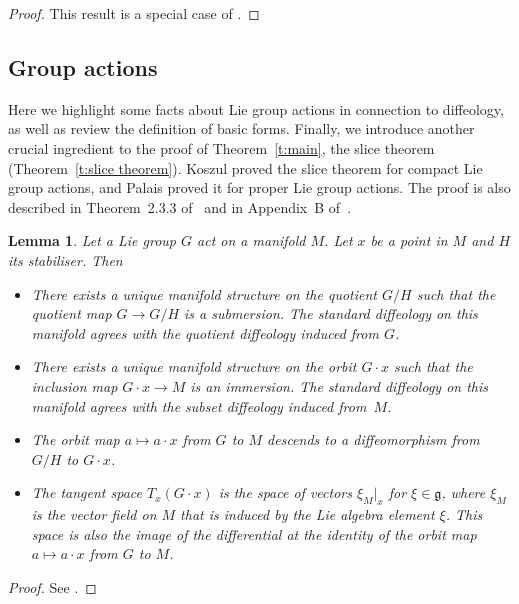 \documentclass[pdftex]{sigma}
\numberwithin{equation}{section}
\newtheorem{Lemma}[Theorem]{Lemma}
\newcommand{\g}{{\mathfrak{g}}} %
\begin{document}
\begin{proof}
This result is a special case of \cite[Section~6.38]{iglesias}.
\end{proof}

\subsection*{Group actions}

Here we highlight some facts about Lie group actions in connection to dif\/feology, as well as review the def\/inition of basic forms. Finally, we introduce another crucial ingredient to the proof of Theorem~\ref{t:main}, the slice theorem (Theorem~\ref{t:slice theorem}). Koszul \cite{koszul} proved the slice theorem for compact Lie group actions, and
Palais \cite{palais} proved it for proper Lie group actions.
The proof is also described in Theorem~2.3.3 of~\cite{DK}
and in Appendix~B of~\cite{GGK}.

\begin{Lemma} \label{facts}
Let a Lie group $G$ act on a manifold $M$.
Let $x$ be a point in $M$ and $H$ its stabiliser. Then
\begin{itemize}\itemsep=0pt
\item
There exists a unique manifold structure on the quotient $G/H$
such that the quotient map $G \to G/H$ is a submersion.
The standard diffeology on this manifold
agrees with the quotient diffeology induced from $G$.

\item
There exists a unique manifold structure on the orbit $G \cdot x$
such that the inclusion map $G \cdot x \to M$ is an immersion.
The standard diffeology on this manifold agrees with the subset diffeology
induced from~$M$.

\item
The orbit map $a \mapsto a \cdot x$ from $G$ to $M$
descends to a diffeomorphism from $G/H$ to $G \cdot x$.

\item
The tangent space $T_x(G \cdot x)$
is the space of vectors $\xi_M|_x$ for $\xi \in \g$,
where $\xi_M$ is the vector field on $M$ that is induced
by the Lie algebra element $\xi$.
This space is also the image of the differential at the identity
of the orbit map $a \mapsto a \cdot x$ from $G$ to $M$.
\end{itemize}
\end{Lemma}

\begin{proof}
See \cite[Section~2, Paragraph~1]{IK}.
\end{proof}
\end{document}
